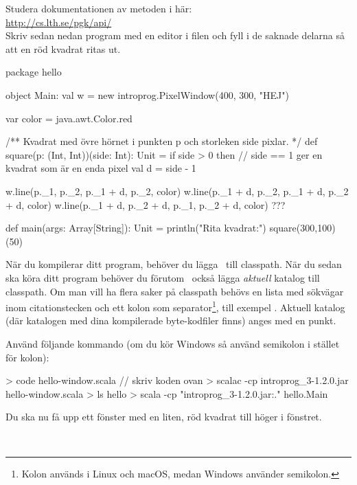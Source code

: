 \Subtask Studera dokumentationen av metoden  i  här:\\ \url{http://cs.lth.se/pgk/api/}
\\ Skriv sedan nedan program med en editor i filen  och fyll i de saknade delarna så att en röd kvadrat ritas ut.

\begin{Code}
package hello

object Main:
  val w = new introprog.PixelWindow(400, 300, "HEJ")

  var color = java.awt.Color.red

  /** Kvadrat med övre hörnet i punkten p och storleken side pixlar. */
  def square(p: (Int, Int))(side: Int): Unit =
    if side > 0 then
      // side == 1 ger en kvadrat som är en enda pixel
      val d = side - 1  

      w.line(p._1,     p._2,     p._1 + d, p._2,     color)
      w.line(p._1 + d, p._2,     p._1 + d, p._2 + d, color)
      w.line(p._1 + d, p._2 + d, p._1,     p._2 + d, color)
      ???

  def main(args: Array[String]): Unit =
    println("Rita kvadrat:")
    square(300,100)(50)
\end{Code}

\noindent
När du kompilerar ditt program, behöver du lägga \LibJar~till classpath.
När du sedan ska köra ditt program behöver du förutom  \LibJar~också lägga \emph{aktuell} katalog till classpath. Om man vill ha flera saker på classpath behövs en lista med sökvägar inom citationstecken och ett kolon som separator\footnote{Kolon används i Linux och macOS, medan Windows använder semikolon.}, till exempel .
Aktuell katalog (där katalogen  med dina kompilerade byte-kodfiler finns) anges med en punkt.

Använd följande kommando (om du kör Windows så använd semikolon i stället för kolon):
\begin{REPL}
> code hello-window.scala  // skriv koden ovan
> scalac -cp introprog_3-1.2.0.jar hello-window.scala
> ls hello
> scala -cp "introprog_3-1.2.0.jar:." hello.Main
\end{REPL}
\noindent Du ska nu få upp ett fönster med en liten, röd kvadrat till höger i fönstret.


\SOLUTION

\TaskSolved \what~

